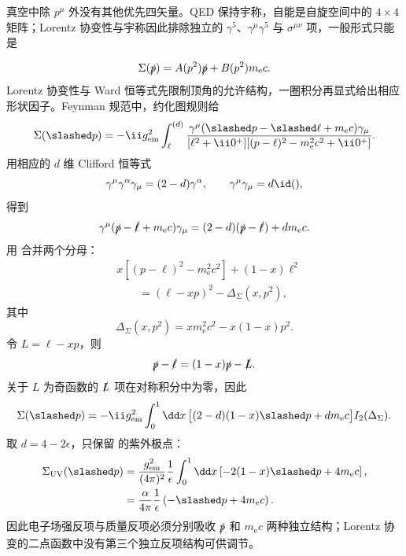 \begin{derivation}
真空中除 $p^\mu$ 外没有其他优先四矢量。QED 保持宇称，自能是自旋空间中的 $4\times4$ 矩阵；Lorentz 协变性与宇称因此排除独立的 $\gamma^5$、$\gamma^\mu\gamma^5$ 与 $\sigma^{\mu\nu}$ 项，一般形式只能是

\begin{equation*}
 {
 \Sigma(\slashed p)
 =A(p^2)\slashed p+B(p^2)m_{\mathrm e} c.}
 \end{equation*}
Lorentz 协变性与 Ward 恒等式先限制顶角的允许结构，一圈积分再显式给出相应形状因子。Feynman 规范中，约化图规则给
\begin{equation*}
 \Sigma(\slashed p)
 =-\ii g_{\rm em}^2
 \int_{\ell}^{(d)}
 \frac{\gamma^\mu(\slashed p-\slashed\ell+m_{\mathrm e} c)\gamma_\mu}
 {[\ell^2+\ii0^+][(p-\ell)^2-m_{\mathrm e}^2c^2+\ii0^+]}.
 \end{equation*}
用相应的 $d$ 维 Clifford 恒等式
\begin{equation*}
 \gamma^\mu\gamma^\alpha\gamma_\mu=(2-d)\gamma^\alpha,
 \qquad
 \gamma^\mu\gamma_\mu=d\id(),
\end{equation*}
得到
\begin{equation*}
 \gamma^\mu(\slashed p-\slashed\ell+m_{\mathrm e} c)\gamma_\mu
 =(2-d)(\slashed p-\slashed\ell)+dm_{\mathrm e} c.
 \end{equation*}
用  合并两个分母：
\begin{align*}
 &x[(p-\ell)^2-m_{\mathrm e}^2c^2]+(1-x)\ell^2\\
 &\qquad=(\ell-xp)^2-\Delta_\Sigma(x,p^2),
\end{align*}
其中
\begin{equation*}
 {
 \Delta_\Sigma(x,p^2)
 =xm_{\mathrm e}^2c^2-x(1-x)p^2.}
 \end{equation*}
令 $L=\ell-xp$，则
\begin{equation*}
 \slashed p-\slashed\ell=(1-x)\slashed p-\slashed L.
\end{equation*}
关于 $L$ 为奇函数的 $\slashed L$ 项在对称积分中为零，因此
\begin{align*}
 \Sigma(\slashed p)
 =-\ii g_{\rm em}^2
 \int_0^1\dd x\,
 \bigl[(2-d)(1-x)\slashed p+dm_{\mathrm e} c\bigr]
 I_2(\Delta_\Sigma).
 \end{align*}
取 $d=4-2\epsilon$，只保留  的紫外极点：
\begin{align*}
 \Sigma_{\rm UV}(\slashed p)
 &=\frac{g_{\rm em}^2}{(4\pi)^2}\frac1\epsilon
 \int_0^1\dd x
 \left[-2(1-x)\slashed p+4m_{\mathrm e} c\right],\\
 &=\frac{\alpha}{4\pi}\frac1\epsilon
 \left(-\slashed p+4m_{\mathrm e} c\right).
 \end{align*}
因此电子场强反项与质量反项必须分别吸收 $\slashed p$ 和 $m_{\mathrm e} c$ 两种独立结构；Lorentz 协变的二点函数中没有第三个独立反项结构可供调节。
\end{derivation}

